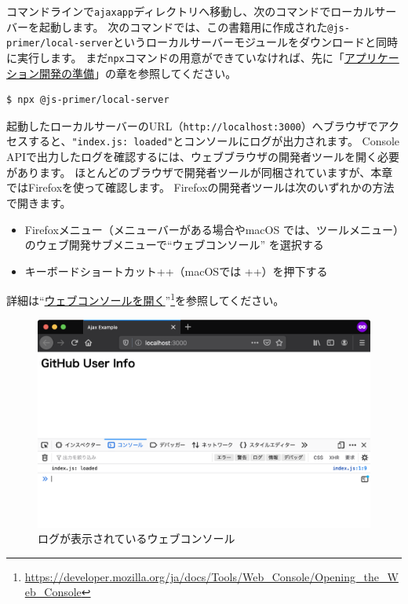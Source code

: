コマンドラインで\texttt{ajaxapp}ディレクトリへ移動し、次のコマンドでローカルサーバーを起動します。
次のコマンドでは、この書籍用に作成された\texttt{@js-primer/local-server}というローカルサーバーモジュールをダウンロードと同時に実行します。
まだ\texttt{npx}コマンドの用意ができていなければ、先に「\hyperlink{setup-local-env}{アプリケーション開発の準備}」の章を参照してください。

\begin{lstlisting}
$ npx @js-primer/local-server
\end{lstlisting}

起動したローカルサーバーのURL（\texttt{http://localhost:3000}）へブラウザでアクセスすると、\texttt{"index.js: loaded"}とコンソールにログが出力されます。
Console
APIで出力したログを確認するには、ウェブブラウザの開発者ツールを開く必要があります。
ほとんどのブラウザで開発者ツールが同梱されていますが、本章ではFirefoxを使って確認します。
Firefoxの開発者ツールは次のいずれかの方法で開きます。

\begin{itemize}
\item
  Firefoxメニュー（メニューバーがある場合やmacOS
  では、ツールメニュー）のウェブ開発サブメニューで``ウェブコンソール''
  を選択する
\item
  キーボードショートカット++（macOSでは
  ++）を押下する
\end{itemize}

詳細は``\href{https://developer.mozilla.org/ja/docs/Tools/Web_Console/Opening_the_Web_Console}{ウェブコンソールを開く}''\footnote{\url{https://developer.mozilla.org/ja/docs/Tools/Web_Console/Opening_the_Web_Console}}を参照してください。

\begin{figure}[h]
\centering
\includegraphics[width=120mm]{fig/fig-1.png}
\caption{ログが表示されているウェブコンソール}
\end{figure}

